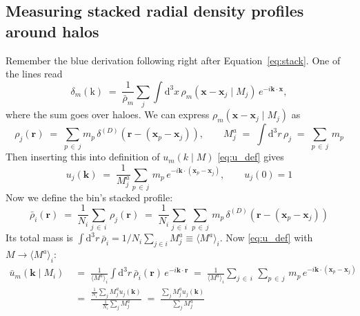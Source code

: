 \documentclass{article}
\newcommand{\dd}{\mathrm{d}}
\begin{document}
\subsection{Measuring stacked radial density profiles around halos} \label{sec:profiles}

Remember the blue derivation following right after Equation~\ref{eq:stack}. One of the lines read
\begin{equation}
    \delta_m(\mathrm{k}) \;=\; \frac{1}{\bar \rho_m} \sum_j \int \dd^3x \, \rho_m (\mathbf{x} - \mathbf{x}_j \mid M_j) \, e^{-i \mathbf{k} \cdot \mathbf{x}},
\end{equation}
where the sum goes over haloes. We can express $\rho_m(\mathbf{x} - \mathbf{x}_j \mid M_j)$ as
\begin{equation}
    \rho_j(\mathbf{r}) \;=\; \sum_{p \, \in \, j} m_p \, \delta^{(D)} (\mathbf{r} - (\mathbf{x}_p - \mathbf{x}_j)), \qquad M_j^a \;=\; \int \dd^3r \, \rho_j \;=\; \sum_{p \, \in \, j} \, m_p
\end{equation}
Then inserting this into definition of $u_m(k \mid M)$ \eqref{eq:u_def} gives
\begin{equation}
    u_j(\mathbf{k}) \; =\; \frac{1}{M_j^a} \sum_{p \, \in \, j} \, m_p \, e^{-i \mathbf{k} \cdot (\mathbf{x}_p - \mathbf{x}_j)}, \qquad u_j(0) = 1
    \label{eq:u_j}
\end{equation}
Now we define the bin's stacked profile:
\begin{equation}
    \bar \rho_i (\mathbf{r}) \;=\; \frac{1}{N_i} \sum_{j \, \in \, i} \, \rho_j (\mathbf{r}) \;=\; \frac{1}{N_i}\sum_{j \, \in \, i} \,\sum_{p \, \in \, j} \, m_p \, \delta^{(D)} (\mathbf{r} - (\mathbf{x}_p - \mathbf{x}_j))
\end{equation}
Its total mass is $\int\dd^3r\,\bar\rho_i = 1/{N_i}\sum_{j\in i}M_j^a \equiv \langle M^a\rangle_i$. Now \eqref{eq:u_def} with $M \to \langle M^a\rangle_i$:
\begin{equation}
\begin{aligned}
    \bar u_m (\mathbf{k} \mid M_i)
    &\;=\;
    \frac{1}{\langle M^a\rangle_i}
    \int \dd^3r \, \bar \rho_i(\mathbf{r}) \,
    e^{-i \mathbf{k} \cdot \mathbf{r}}
    \;=\;
     \frac{1}{\langle M^a\rangle_i} \sum_{j \, \in \, i} \,\sum_{p \, \in \, j} \, m_p \, e^{-i \mathbf{k} \cdot (\mathbf{x}_p - \mathbf{x}_j)}
    \\[2ex]
    &\;=\; \frac{\frac{1}{N_i}\sum_j M_j^a u_j(\mathbf{k})}
         {\frac{1}{N_i}\sum_j M_j^a}
         \;=\; \frac{\sum_j M_j^a u_j(\mathbf{k})}
         {\sum_j M_j^a}
\end{aligned}
\end{equation}
\end{document}
